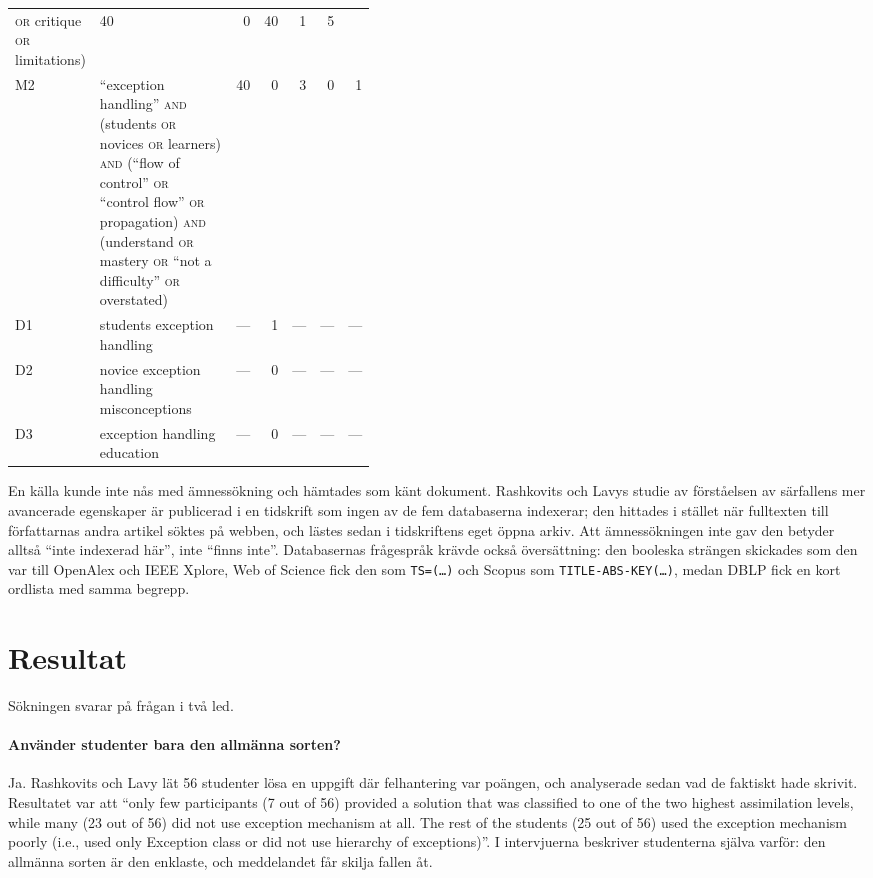 \begin{table}[htbp]
\begin{tabular}{@{}lp{0.42\linewidth}rrrrr@{}}
      \textsc{or} critique \textsc{or} limitations)
      & 40 & 0 & 40 & 1 & 5 \\
    M2 & \enquote{exception handling} \textsc{and} (students
      \textsc{or} novices \textsc{or} learners) \textsc{and}
      (\enquote{flow of control} \textsc{or} \enquote{control flow}
      \textsc{or} propagation) \textsc{and} (understand \textsc{or}
      mastery \textsc{or} \enquote{not a difficulty} \textsc{or}
      overstated)
      & 40 & 0 & 3 & 0 & 1 \\
    D1 & students exception handling & --- & 1 & --- & --- & --- \\
    D2 & novice exception handling misconceptions
      & --- & 0 & --- & --- & --- \\
    D3 & exception handling education & --- & 0 & --- & --- & --- \\
    \bottomrule
  \end{tabular}
\end{table}

En källa kunde inte nås med ämnessökning och hämtades som känt dokument.
Rashkovits och Lavys studie av förståelsen av särfallens mer avancerade
egenskaper\autocite{RashkovitsLavy2012} är publicerad i en tidskrift som
ingen av de fem databaserna indexerar; den hittades i stället när
fulltexten till författarnas andra artikel söktes på webben, och lästes
sedan i tidskriftens eget öppna arkiv.  Att ämnessökningen inte gav den
betyder alltså \enquote{inte indexerad här}, inte \enquote{finns inte}.
Databasernas frågespråk krävde också översättning: den booleska strängen
skickades som den var till OpenAlex och IEEE Xplore, Web of Science fick
den som \texttt{TS=(\dots)} och Scopus som
\texttt{TITLE-ABS-KEY(\dots)}, medan DBLP fick en kort ordlista med samma
begrepp.

\section{Resultat}
\label{sec:nyb-resultat}

Sökningen svarar på frågan i två led.

\paragraph{Använder studenter bara den allmänna sorten?}
Ja.  Rashkovits och Lavy lät 56 studenter lösa en uppgift där
felhantering var poängen, och analyserade sedan vad de faktiskt hade
skrivit.  Resultatet var att \enquote{only few participants (7 out of 56)
provided a solution that was classified to one of the two highest
assimilation levels, while many (23 out of 56) did not use exception
mechanism at all.  The rest of the students (25 out of 56) used the
exception mechanism poorly (i.e., used only Exception class or did not
use hierarchy of exceptions)}\autocite[183]{RashkovitsLavy2011}.  I
intervjuerna beskriver studenterna själva varför: den allmänna sorten är
den enklaste, och meddelandet får skilja fallen
åt\autocite[203]{RashkovitsLavy2011}.

